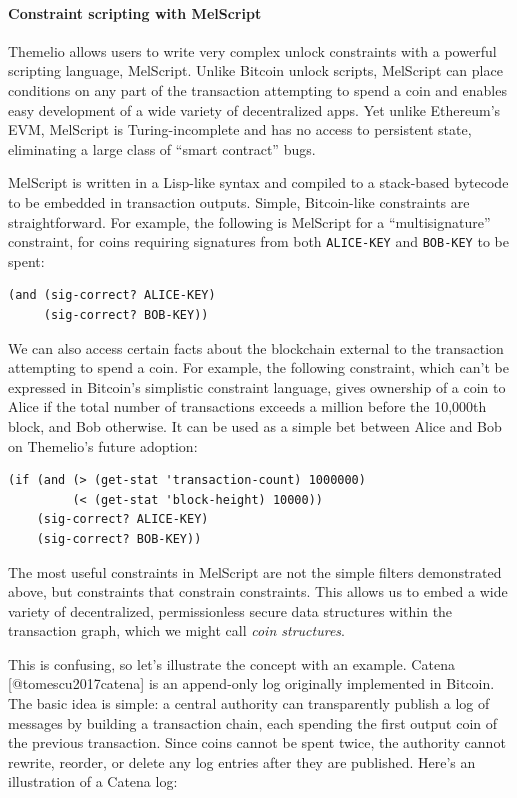 \documentclass[]{article}
\let\oldparagraph\paragraph
\renewcommand{\paragraph}[1]{\oldparagraph{#1}\mbox{}}
\begin{document}
\hypertarget{constraint-scripting-with-melscript}{%
\paragraph{Constraint scripting with MelScript
}\label{constraint-scripting-with-melscript}}

Themelio allows users to write very complex unlock constraints with a
powerful scripting language, MelScript. Unlike Bitcoin unlock scripts,
MelScript can place conditions on any part of the transaction attempting
to spend a coin and enables easy development of a wide variety of
decentralized apps. Yet unlike Ethereum's EVM, MelScript is
Turing-incomplete and has no access to persistent state, eliminating a
large class of ``smart contract'' bugs.

MelScript is written in a Lisp-like syntax and compiled to a stack-based
bytecode to be embedded in transaction outputs. Simple, Bitcoin-like
constraints are straightforward. For example, the following is MelScript
for a ``multisignature'' constraint, for coins requiring signatures from
both \texttt{ALICE-KEY} and \texttt{BOB-KEY} to be spent:

\begin{verbatim}
(and (sig-correct? ALICE-KEY)
     (sig-correct? BOB-KEY))
\end{verbatim}

We can also access certain facts about the blockchain external to the
transaction attempting to spend a coin. For example, the following
constraint, which can't be expressed in Bitcoin's simplistic constraint
language, gives ownership of a coin to Alice if the total number of
transactions exceeds a million before the 10,000th block, and Bob
otherwise. It can be used as a simple bet between Alice and Bob on
Themelio's future adoption:

\begin{verbatim}
(if (and (> (get-stat 'transaction-count) 1000000)
         (< (get-stat 'block-height) 10000))
    (sig-correct? ALICE-KEY)
    (sig-correct? BOB-KEY))
\end{verbatim}

The most useful constraints in MelScript are not the simple filters
demonstrated above, but constraints that constrain constraints. This
allows us to embed a wide variety of decentralized, permissionless
secure data structures within the transaction graph, which we might call
\emph{coin structures}.

This is confusing, so let's illustrate the concept with an example.
Catena {[}@tomescu2017catena{]} is an append-only log originally
implemented in Bitcoin. The basic idea is simple: a central authority
can transparently publish a log of messages by building a transaction
chain, each spending the first output coin of the previous transaction.
Since coins cannot be spent twice, the authority cannot rewrite,
reorder, or delete any log entries after they are published. Here's an
illustration of a Catena log:
\end{document}
